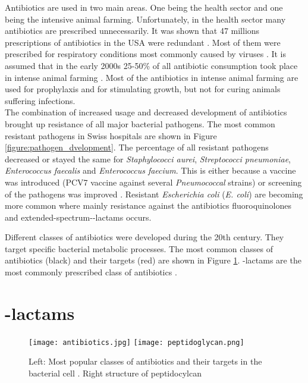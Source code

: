 Antibiotics are used in two main areas. One being the health sector and one being the intensive animal farming. Unfortunately, in the health sector many antibiotics are prescribed unnecessarily. It was shown that 47 millions prescriptions of antibiotics in the USA were redundant \cite{noauthor_antibiotic_2019}. Most of them were prescribed for respiratory conditions most commonly caused by viruses \cite{noauthor_antibiotic_2019}. It is assumed that in the early 2000s 25-50\% of all antibiotic consumption took place in intense animal farming  \cite{palumbi_humans_2001}. Most of the antibiotics in intense animal farming are used for prophylaxis and for stimulating growth, but not for curing animals suffering infections. \\
The combination of increased usage and decreased development of antibiotics brought up resistance of all major bacterial pathogens. The most common resistant pathogens in Swiss hospitals are shown in Figure \ref{figure:pathogen_dvelopment}. The percentage of all resistant pathogens decreased or stayed the same for \textit{Staphylococci aurei}, \textit{Streptococci pneumoniae}, \textit{Enterococcus faecalis} and \textit{Enterococcus faecium}. This is either because a vaccine was introduced (PCV7 vaccine against several \textit{Pneumococcal} strains) or screening of the pathogens was improved \cite{swiss_hospitals_pathogens}. Resistant \textit{Escherichia coli} (\textit{E. coli}) are becoming more common where mainly resistance against the antibiotics fluoroquinolones and extended-spectrum-\textbeta-lactams occurs. 

Different classes of antibiotics were developed during the 20th century. They target specific bacterial metabolic processes. The most common classes of antibiotics (black) and their targets (red) are shown in Figure \ref{figure:antibiotics}. \textbeta-lactams are the most commonly prescribed class of antibiotics \cite{blogger_guide_2019}.

\section{\textbeta-lactams}
\begin{figure}
	\texttt{[image: antibiotics.jpg]}
	\texttt{[image: peptidoglycan.png]}
	\caption{Left: Most popular classes of antibiotics and their targets in the bacterial cell \cite{wright_english:_2010}. Right structure of peptidocylcan \cite{illustrator_english:_nodate}}
	\label{figure:antibiotics}
\end{figure}

